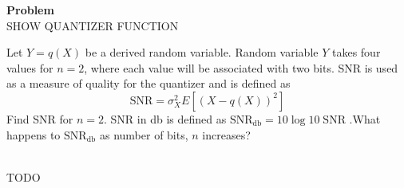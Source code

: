 \documentclass[12pt]{article}
\newenvironment{Ex}{\textbf{Problem}\vspace{.75em}\\}{}
\begin{document}
\begin{enumerate}
\begin{Ex}
    {\huge SHOW QUANTIZER FUNCTION}

    Let $Y = q(X)$ be a derived random variable. Random variable $Y$
    takes four values for $n = 2$, where each value will be associated
    with two bits. SNR is used as a measure of quality for the
    quantizer and is defined as $$\text{SNR} = \sigma_X^2
    E[(X−q(X))^2]$$ Find SNR for $n=2$. SNR in db is defined as
    $\text{SNR}_{\text{db}} = 10\log 10\;\text{SNR}$ .What happens to
    $\text{SNR}_{\text{db}}$ as number of bits, $n$ increases?

    \begin{solution} \hfill \vspace{.75em} \\
      {\huge TODO}
    \end{solution}
  \end{Ex}

\end{enumerate}
\end{document}
